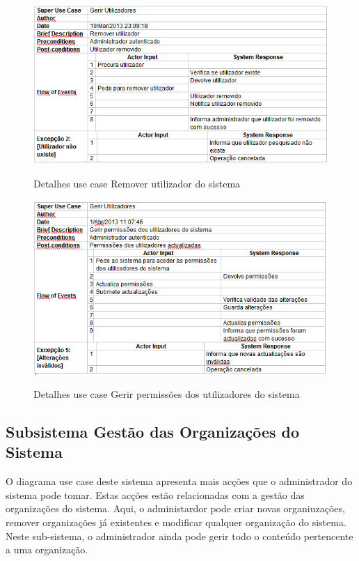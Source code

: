 ﻿\documentclass[12pt,a4paper]{article}
\begin{document}
\begin{figure}[h!]
\centering
\includegraphics[scale=0.7]{d_usecase/A_removerutilizador}
\label{usecase}
\caption{Detalhes use case Remover utilizador do sistema}
\end{figure}

\begin{figure}[h!]
\centering
\includegraphics[scale=0.7]{d_usecase/A_permissoes}
\label{usecase}
\caption{Detalhes use case Gerir permissões dos utilizadores do sistema} 
\end{figure}

\clearpage

\subsection{Subsistema Gestão das Organizações do Sistema}
O diagrama use case deste sistema apresenta mais acções que o administrador do sistema
pode tomar. Estas acções estão relacionadas com a gestão das organizações do sistema. Aqui, o
administardor pode criar novas organiuzações, remover organizações já existentes e modificar qualquer organização do sistema. Neste sub-sistema, o administrador ainda pode gerir todo o conteúdo pertencente a uma organização.\\
\end{document}
